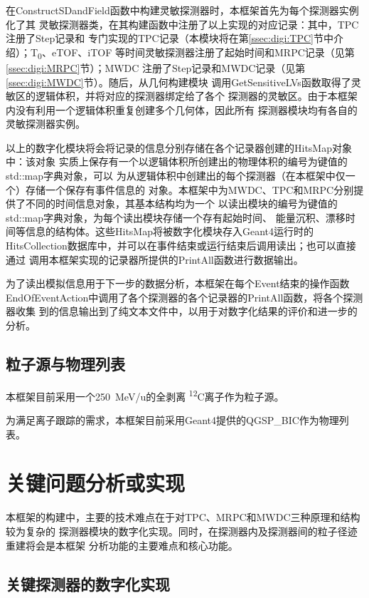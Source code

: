 \documentclass[bachelor,openany,oneside,color]{buaathesis}
\def\TZ{T\textsubscript{0}}
\def\PrimaryParticle{\textsuperscript{12}C}
\begin{document}
在ConstructSDandField函数中构建灵敏探测器时，本框架首先为每个探测器实例化了其
灵敏探测器类，在其构建函数中注册了以上实现的对应记录：其中，TPC注册了Step记录和
专门实现的TPC记录（本模块将在第\ref{ssec:digi:TPC}节中介绍）；\TZ、eTOF、iTOF
等时间灵敏探测器注册了起始时间和MRPC记录（见第\ref{ssec:digi:MRPC}节）；MWDC
注册了Step记录和MWDC记录（见第\ref{ssec:digi:MWDC}节）。随后，从几何构建模块
调用GetSensitiveLVs函数取得了灵敏区的逻辑体积，并将对应的探测器绑定给了各个
探测器的灵敏区。由于本框架内没有利用一个逻辑体积重复创建多个几何体，因此所有
探测器模块均有各自的灵敏探测器实例。

以上的数字化模块将会将记录的信息分别存储在各个记录器创建的HitsMap对象中：该对象
实质上保存有一个以逻辑体积所创建出的物理体积的编号为键值的std::map字典对象，可以
为从逻辑体积中创建出的每个探测器（在本框架中仅一个）存储一个保存有事件信息的
对象。本框架中为MWDC、TPC和MRPC分别提供了不同的时间信息对象，其基本结构均为一个
以读出模块的编号为键值的std::map字典对象，为每个读出模块存储一个存有起始时间、
能量沉积、漂移时间等信息的结构体。这些HitsMap将被数字化模块存入Geant4运行时的
HitsCollection数据库中，并可以在事件结束或运行结束后调用读出；也可以直接通过
调用本框架实现的记录器所提供的PrintAll函数进行数据输出。

为了读出模拟信息用于下一步的数据分析，本框架在每个Event结束的操作函数
EndOfEventAction中调用了各个探测器的各个记录器的PrintAll函数，将各个探测器收集
到的信息输出到了纯文本文件中，以用于对数字化结果的评价和进一步的分析。

\section{粒子源与物理列表}

本框架目前采用一个\SI{250}{\MeV/u}的全剥离 \PrimaryParticle 离子作为粒子源。

为满足离子跟踪的需求，本框架目前采用Geant4提供的QGSP\_BIC作为物理列表。

\chapter{关键问题分析或实现}

本框架的构建中，主要的技术难点在于对TPC、MRPC和MWDC三种原理和结构较为复杂的
探测器模块的数字化实现。同时，在探测器内及探测器间的粒子径迹重建将会是本框架
分析功能的主要难点和核心功能。

\section{关键探测器的数字化实现}
\end{document}
